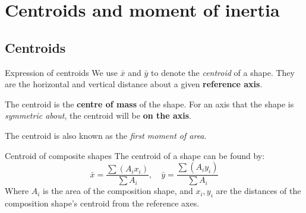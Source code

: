 
\section{Centroids and moment of inertia}

\subsection{Centroids}
\begin{knBox}
    {Expression of centroids}
    We use $\bar{x}$ and $\bar{y}$ to denote the \emph{centroid} of a shape. They are the horizontal and vertical distance about a given \textbf{reference axis}.

    The centroid is the \textbf{centre of mass} of the shape. For an axis that the shape is \emph{symmetric about}, the centroid will be \textbf{on the axis}.

    The centroid is also known as the \emph{first moment of area}.
\end{knBox}
\begin{definition}
    {Centroid of composite shapes}
    The centroid of a shape can be found by:
    \[\bar{x}=\frac{\sum (A_i x_i)}{\sum A_i},\quad \bar{y}=\frac{\sum (A_i y_i)}{\sum A_i}\]
    Where $A_i$ is the area of the composition shape, and $x_i, y_i$ are the distances of the composition shape's centroid from the reference axes.
\end{definition}

\label{sec:momentinertia}
